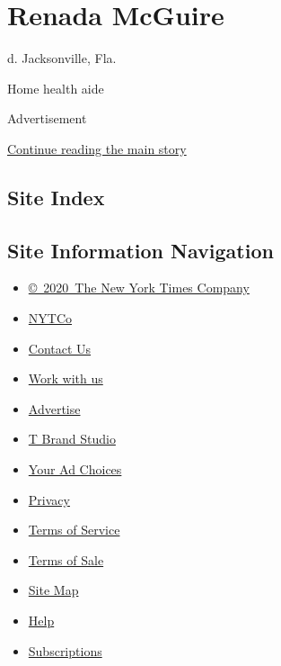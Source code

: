 \hypertarget{renada-mcguire}{%
\section{Renada McGuire}\label{renada-mcguire}}

d. Jacksonville, Fla.

Home health aide

Advertisement

\protect\hyperlink{after-bottom}{Continue reading the main story}

\hypertarget{site-index}{%
\subsection{Site Index}\label{site-index}}

\hypertarget{site-information-navigation}{%
\subsection{Site Information
Navigation}\label{site-information-navigation}}

\begin{itemize}
\tightlist
\item
  \href{https://help.nytimes.com/hc/en-us/articles/115014792127-Copyright-notice}{©~2020~The
  New York Times Company}
\end{itemize}

\begin{itemize}
\tightlist
\item
  \href{https://www.nytco.com/}{NYTCo}
\item
  \href{https://help.nytimes.com/hc/en-us/articles/115015385887-Contact-Us}{Contact
  Us}
\item
  \href{https://www.nytco.com/careers/}{Work with us}
\item
  \href{https://nytmediakit.com/}{Advertise}
\item
  \href{http://www.tbrandstudio.com/}{T Brand Studio}
\item
  \href{https://www.nytimes.com/privacy/cookie-policy\#how-do-i-manage-trackers}{Your
  Ad Choices}
\item
  \href{https://www.nytimes.com/privacy}{Privacy}
\item
  \href{https://help.nytimes.com/hc/en-us/articles/115014893428-Terms-of-service}{Terms
  of Service}
\item
  \href{https://help.nytimes.com/hc/en-us/articles/115014893968-Terms-of-sale}{Terms
  of Sale}
\item
  \href{https://spiderbites.nytimes.com}{Site Map}
\item
  \href{https://help.nytimes.com/hc/en-us}{Help}
\item
  \href{https://www.nytimes.com/subscription?campaignId=37WXW}{Subscriptions}
\end{itemize}
